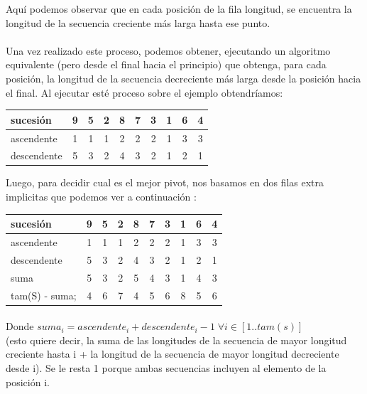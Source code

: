 Aquí podemos observar que en cada posición de la fila longitud, se encuentra la longitud de la secuencia creciente más larga hasta ese punto.

\paragraph{}
Una vez realizado este proceso, podemos obtener, ejecutando un algoritmo equivalente (pero desde el final hacia el principio) que obtenga, para cada posición, la longitud de la secuencia decreciente más larga desde la posición hacia el final. Al ejecutar esté proceso sobre el ejemplo obtendríamos:

\begin{center}
   \begin{tabular}{| l | c | c |c |c |c |c |c |c |c | }
     \hline
     sucesión & 9 & 5 & 2 & 8 & 7 & 3 & 1 & 6 & 4 \\ \hline
     ascendente & 1& 1& 1& 2& 2& 2& 1 &3 & 3 \\ \hline
     descendente & 5& 3& 2& 4& 3& 2& 1 &2 & 1 \\ \hline
          \hline
   \end{tabular}
 \end{center}

Luego, para decidir cual es el mejor pivot, nos basamos en dos filas extra implicitas que podemos ver a continuación :

\begin{center}
   \begin{tabular}{| l | c | c |c |c |c |c |c |c |c | }
     \hline
     sucesión 		& 9& 5& 2& 8& 7& 3& 1 &6 & 4 \\ \hline
     ascendente 	& 1& 1& 1& 2& 2& 2& 1 &3 & 3 \\ \hline
     descendente 	& 5& 3& 2& 4& 3& 2& 1 &2 & 1 \\ \hline
     suma	 	& 5& 3& 2& 5& 4& 3& 1 &4 & 3 \\ \hline
     tam(S) - suma;	& 4& 6& 7& 4& 5& 6& 8 &5 & 6 \\ \hline
     
          \hline
   \end{tabular}
 \end{center}


\paragraph{}
Donde $suma_i = ascendente_i + descendente_i - 1 \; \forall i \in [ 1..tam(s)]$ \\(esto quiere decir, la suma de las longitudes de la secuencia de mayor longitud creciente hasta i + la longitud de la secuencia de mayor longitud decreciente desde i). Se le resta 1 porque ambas secuencias incluyen al elemento de la posición i.

